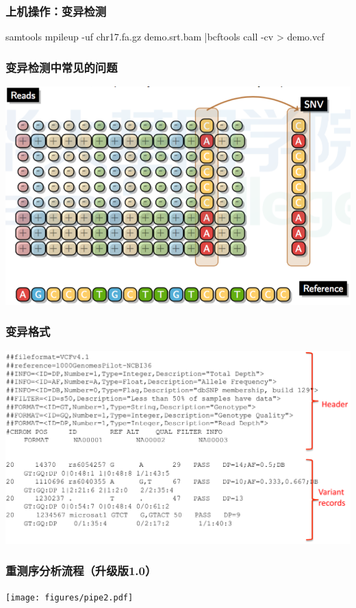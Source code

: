 \documentclass[12pt]{beamer}
\begin{document}
\begin{frame}\frametitle{上机操作：变异检测}
  samtools mpileup -uf chr17.fa.gz demo.srt.bam |bcftools call -cv > demo.vcf
\end{frame}
\begin{frame}\frametitle{变异检测中常见的问题}
  \includegraphics[width=\textwidth]{figures/old_slides/strand.png}
\end{frame}
\begin{frame}\frametitle{变异格式}
  \includegraphics[width=\textwidth]{figures/old_slides/vcf-for.png}
\end{frame}

\begin{frame}\frametitle{重测序分析流程（升级版1.0）}
  \texttt{[image: figures/pipe2.pdf]}
\end{frame}
\end{document}
